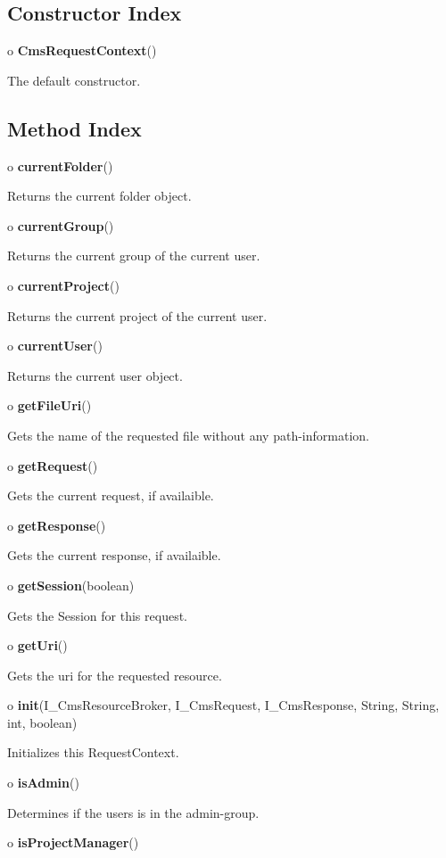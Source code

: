 \subsection*{  Constructor Index }

\begin{description}
\item o {\bf CmsRequestContext}()  

The default constructor. 
\end{description}

\subsection*{  Method Index }

\begin{description}
\item o {\bf currentFolder}()  

Returns the current folder object.  
\item o {\bf currentGroup}()  

Returns the current group of the current user.  
\item o {\bf currentProject}()  

Returns the current project of the current user.  
\item o {\bf currentUser}()  

Returns the current user object.  
\item o {\bf getFileUri}()  

Gets the name of the requested file without any path-information.  
\item o {\bf getRequest}()  

Gets the current request, if availaible.  
\item o {\bf getResponse}()  

Gets the current response, if availaible.  
\item o {\bf getSession}(boolean)  

Gets the Session for this request.  
\item o {\bf getUri}()  

Gets the uri for the requested resource.  
\item o {\bf init}(I\_CmsResourceBroker, I\_CmsRequest, I\_CmsResponse,
String, String, int, boolean)  

Initializes this RequestContext.  
\item o {\bf isAdmin}()  

Determines if the users is in the admin-group.  
\item o {\bf isProjectManager}()  


\end{description}
